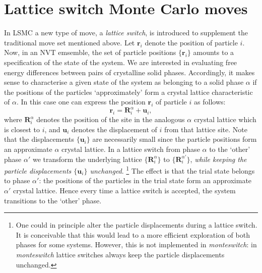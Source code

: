 \documentclass{report}
\begin{document}
\section{Lattice switch Monte Carlo moves}\label{sec:lattice_switch}
In LSMC a new type of move, a \emph{lattice switch}, is introduced to supplement the traditional move set mentioned above. Let $\mathbf{r}_i$ 
denote the position of particle $i$. Now, in an NVT emsemble, the set of particle positions $\lbrace\mathbf{r}_i\rbrace$ amounts to a specification 
of the state of the system. We are interested in evaluating free energy differences between pairs of crystalline solid phases. Accordingly, it 
makes sense to characterise a given state of the system as belonging to a solid phase $\alpha$ if the positions of the particles `approximately' 
form a crystal lattice characteristic of $\alpha$. In this case one can express the position $\mathbf{r}_i$ of particle $i$ as follows:
\begin{equation}
\mathbf{r}_i=\mathbf{R}^{\alpha}_i+\mathbf{u}_i,
\end{equation}
where $\mathbf{R}^{\alpha}_i$ denotes the position of the site in the analogous $\alpha$ crystal lattice which is closest to $i$, and $\mathbf{u}_i$ denotes 
the displacement of $i$ from that lattice site. Note that the displacements $\lbrace\mathbf{u}_i\rbrace$ are necessarily small since the particle
positions form an approximate $\alpha$ crystal lattice. In a lattice switch from phase $\alpha$ to the `other' phase $\alpha'$ we transform the 
underlying lattice $\lbrace\mathbf{R}^{\alpha}_i\rbrace$ to $\lbrace\mathbf{R}^{\alpha'}_i\rbrace$, \emph{while keeping the particle displacements 
$\lbrace\mathbf{u}_i\rbrace$ unchanged}.
\footnote{One could in principle alter the particle displacements during a lattice switch. It is conceivable that this would lead to a more efficient
exploration of both phases for some systems. However, this is not implemented in \emph{monteswitch}: in \emph{monteswitch} lattice switches always
keep the particle displacements unchanged.}
The effect is that the trial state belongs to phase $\alpha'$: the positions of the particles in the trial state form an approximate $\alpha'$ crystal 
lattice. Hence every time a lattice switch is accepted, the system transitions to the `other' phase. 
\end{document}
